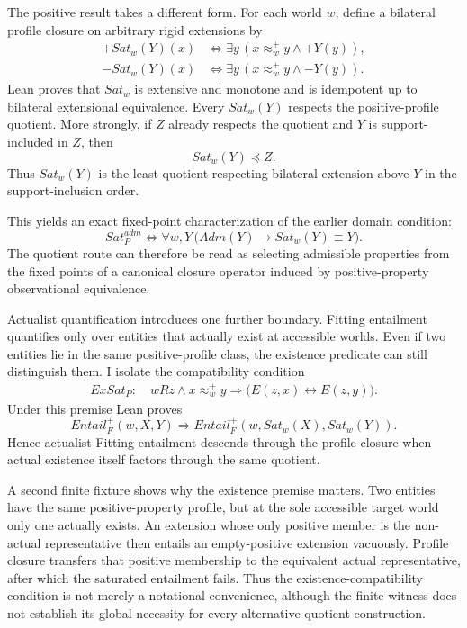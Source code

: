The positive result takes a different form. For each world \(w\), define a bilateral profile closure on arbitrary rigid extensions by
\[
\begin{aligned}
  +Sat_w(Y)(x)
  &\Longleftrightarrow
  \exists y\,(x\approx_w^+y\land +Y(y)),\\
  -Sat_w(Y)(x)
  &\Longleftrightarrow
  \exists y\,(x\approx_w^+y\land -Y(y)).
\end{aligned}
\]
Lean proves that \(Sat_w\) is extensive and monotone and is idempotent up to bilateral extensional equivalence. Every \(Sat_w(Y)\) respects the positive-profile quotient. More strongly, if \(Z\) already respects the quotient and \(Y\) is support-included in \(Z\), then
\[
  Sat_w(Y)\preceq Z.
\]
Thus \(Sat_w(Y)\) is the least quotient-respecting bilateral extension above \(Y\) in the support-inclusion order.

This yields an exact fixed-point characterization of the earlier domain condition:
\[
\boxed{
  Sat_P^{adm}
  \Longleftrightarrow
  \forall w,Y\,
  \bigl(Adm(Y)\rightarrow Sat_w(Y)\equiv Y\bigr).
}
\]
The quotient route can therefore be read as selecting admissible properties from the fixed points of a canonical closure operator induced by positive-property observational equivalence.

Actualist quantification introduces one further boundary. Fitting entailment quantifies only over entities that actually exist at accessible worlds. Even if two entities lie in the same positive-profile class, the existence predicate can still distinguish them. I isolate the compatibility condition
\[
\begin{split}
  ExSat_P:\quad
  wRz\land x\approx_w^+y
  \Longrightarrow
  \bigl(E(z,x)\leftrightarrow E(z,y)\bigr).
\end{split}
\]
Under this premise Lean proves
\[
\boxed{
  Entail_F^+(w,X,Y)
  \Longrightarrow
  Entail_F^+(w,Sat_w(X),Sat_w(Y)).
}
\]
Hence actualist Fitting entailment descends through the profile closure when actual existence itself factors through the same quotient.

A second finite fixture shows why the existence premise matters. Two entities have the same positive-property profile, but at the sole accessible target world only one actually exists. An extension whose only positive member is the non-actual representative then entails an empty-positive extension vacuously. Profile closure transfers that positive membership to the equivalent actual representative, after which the saturated entailment fails. Thus the existence-compatibility condition is not merely a notational convenience, although the finite witness does not establish its global necessity for every alternative quotient construction.

